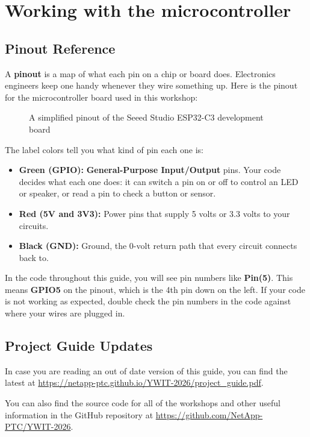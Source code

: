 \section{Working with the microcontroller}
\subsection{Pinout Reference} \label{pinout}
A \textbf{pinout} is a map of what each pin on a chip or board does. Electronics engineers
keep one handy whenever they wire something up. Here is the pinout for the microcontroller
board used in this workshop:
\begin{figure}[H]
\centering
    \caption{A simplified pinout of the Seeed Studio ESP32-C3 development board}
\end{figure}

The label colors tell you what kind of pin each one is:
\begin{itemize}
    \item \textbf{Green (GPIO):} \textbf{General-Purpose Input/Output} pins. Your code decides what
    each one does: it can switch a pin on or off to control an LED or speaker, or read a pin to
    check a button or sensor.
    \item \textbf{Red (5V and 3V3):} Power pins that supply 5 volts or 3.3 volts to your circuits.
    \item \textbf{Black (GND):} Ground, the 0-volt return path that every circuit connects back to.
\end{itemize}

In the code throughout this guide, you will see pin numbers like \textbf{Pin(5)}. This means
\textbf{GPIO5} on the pinout, which is the 4th pin down on the left. If your code is not working
as expected, double check the pin numbers in the code against where your wires are plugged in.

\subsection{Project Guide Updates}

In case you are reading an out of date version of this guide, you can find the latest at
\url{https://netapp-ptc.github.io/YWIT-2026/project_guide.pdf}.

You can also find the source code for all of the workshops and other useful information in the GitHub
repository at \url{https://github.com/NetApp-PTC/YWIT-2026}.
